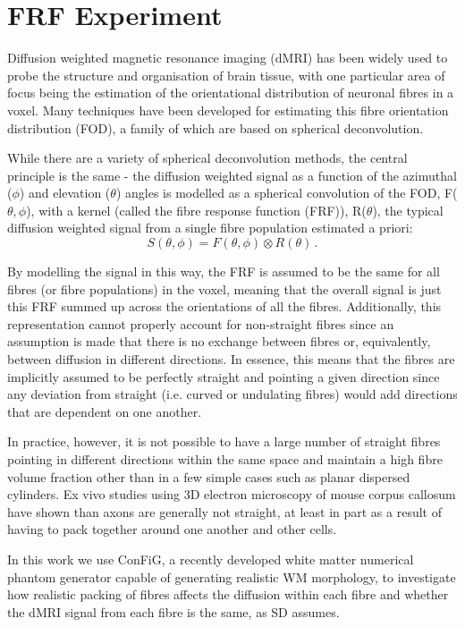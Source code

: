 \chapter{FRF Experiment}
\label{chap:frf_experiment}

Diffusion weighted magnetic resonance imaging (dMRI) has been widely used to probe the structure and organisation of brain tissue, with one particular area of focus being the estimation of the orientational distribution of neuronal fibres in a voxel. Many techniques have been developed for estimating this fibre orientation distribution (FOD), a family of which are based on spherical deconvolution.

While there are a variety of spherical deconvolution methods, the central principle is the same - the diffusion weighted signal as a function of the azimuthal ($\phi$) and elevation ($\theta$) angles is modelled as a spherical convolution of the FOD, F($\theta,\phi$), with a kernel (called the fibre response function (FRF)), R($\theta$), the typical diffusion weighted signal from a single fibre population estimated a priori:
\begin{equation}
  S(\theta, \phi) = F(\theta, \phi) \otimes R(\theta) \,.
  \label{eq:spherical_conv}
\end{equation}

By modelling the signal in this way, the FRF is assumed to be the same for all fibres (or fibre populations) in the voxel, meaning that the overall signal is just this FRF summed up across the orientations of all the fibres.
Additionally, this representation cannot properly account for non-straight fibres since an assumption is made that there is no exchange between fibres or, equivalently, between diffusion in different directions.
In essence, this means that the fibres are implicitly assumed to be perfectly straight and pointing a given direction since any deviation from straight (i.e. curved or undulating fibres) would add directions that are dependent on one another.

In practice, however, it is not possible to have a large number of straight fibres pointing in different directions within the same space and maintain a high fibre volume fraction other than in a few simple cases such as planar dispersed cylinders. Ex vivo studies using 3D electron microscopy of mouse corpus callosum have shown than axons are generally not straight, at least in part as a result of having to pack together around one another and other cells.

In this work we use ConFiG, a recently developed white matter numerical phantom generator capable of generating realistic WM morphology, to investigate how realistic packing of fibres affects the diffusion within each fibre and whether the dMRI signal from each fibre is the same, as SD assumes.

